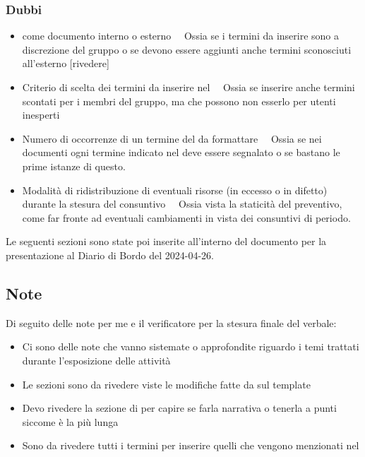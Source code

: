 \subsubsection{Dubbi}
\begin{itemize}
	\item \Glossario come documento interno o esterno \ \rightarrow\ Ossia se i termini da inserire sono a discrezione del gruppo o se devono essere aggiunti anche termini sconosciuti all'esterno [rivedere]
	\item Criterio di scelta dei termini da inserire nel \Glossario \ \rightarrow\ Ossia se inserire anche termini scontati per i membri del gruppo, ma che possono non esserlo per utenti inesperti
	\item Numero di occorrenze di un termine del \Glossario da formattare \ \rightarrow\ Ossia se nei documenti ogni termine indicato nel \Glossario deve essere segnalato o se bastano le prime istanze di questo.
	\item Modalità di ridistribuzione di eventuali risorse (in eccesso o in difetto) durante la stesura del consuntivo \ \rightarrow\ Ossia vista la staticità del preventivo, come far fronte ad eventuali cambiamenti in vista dei consuntivi di periodo.
\end{itemize}
\par Le seguenti sezioni sono state poi inserite all'interno del documento per la presentazione al Diario di Bordo del 2024-04-26.

\subsection{Note}
\par Di seguito delle note per me e il verificatore per la stesura finale del verbale:
\begin{itemize}
	\item Ci sono delle note che vanno sistemate o approfondite riguardo i temi trattati durante l'esposizione delle attività
	\item Le sezioni sono da rivedere viste le modifiche fatte da \riccardo sul template
	\item Devo rivedere la sezione di \marco per capire se farla narrativa o tenerla a punti siccome è la più lunga
	\item Sono da rivedere tutti i termini per inserire quelli che vengono menzionati nel \Glossario
\end{itemize}